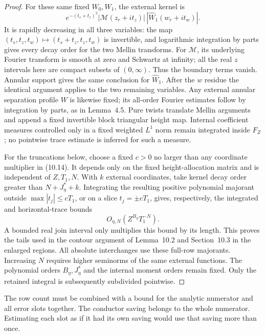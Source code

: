 \documentclass[10pt,reqno,a4paper]{amsart}
\theoremstyle{remark}
\begin{document}
\begin{proof}
For these same fixed $W_0,W_1$, the external kernel is
\[
 e^{-(t_s+t_z)^2}
       |\mathcal M(z_r+it_z)|\,|\widehat W_1(w_r+it_w)|.
\]
It is rapidly decreasing in all three variables: the map
$(t_s,t_z,t_w)\mapsto(t_s+t_z,t_z,t_w)$ is invertible, and
logarithmic integration by parts gives every decay order for the
two Mellin transforms. For $\mathcal M$, its underlying Fourier
transform is smooth at zero and Schwartz at infinity; all the real
$z$ intervals here are compact subsets of $(0,\infty)$. Thus the
boundary terms vanish. Annular support gives the same conclusion for
$\widehat W_1$. After the $w$ residue the identical argument applies
to the two remaining variables. Any external annular separation
profile $W$ is likewise fixed; its all-order Fourier estimates follow
by integration by parts, as in Lemma~4.5. Pure twists translate Mellin
arguments and append a fixed invertible block triangular height map.
Internal coefficient measures controlled only in a fixed weighted
$L^1$ norm remain integrated inside $F_Z$; no pointwise trace estimate
is inferred for such a measure.

For the truncations below, choose a fixed $c>0$ no larger than any
coordinate multiplier in (10.14). It depends only on the fixed
height-allocation matrix and is independent of $Z,T_1,N$.
With $k$ external coordinates, take kernel decay order greater than
$N+J_\eta^*+k$. Integrating the resulting positive polynomial
majorant outside $\max|t_j|\le cT_1$, or on a slice $t_j=\pm cT_1$,
gives, respectively, the integrated and horizontal-trace bounds
\[
                    O_{\eta,N}(Z^{B_\eta}T_1^{-N}).
\]
A bounded real join interval only multiplies this bound by its
length. This proves the tails used in the contour argument of
Lemma~10.2 and Section~10.3 in the enlarged regions. All absolute
interchanges use these full-row majorants. Increasing $N$ requires higher seminorms of the same external
functions. The polynomial orders $B_\eta,J_\eta^*$ and the internal
moment orders remain fixed.
Only the retained integral is subsequently subdivided pointwise.
\end{proof}

The row count must be combined with a bound for the analytic numerator
and all error slots together. The conductor saving belongs to the whole
numerator. Estimating each slot as if it had its own saving would use
that saving more than once.
\end{document}
